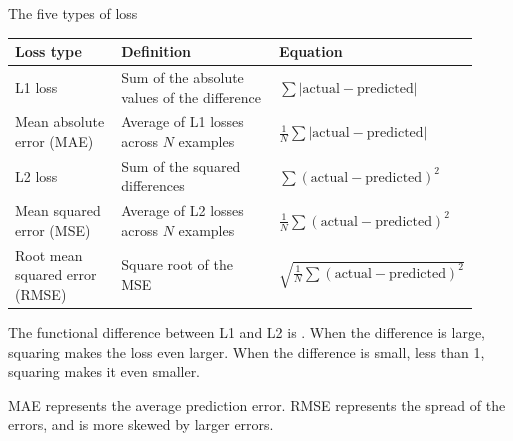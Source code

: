 \begin{frame}{The five types of loss}
  \begin{withmargin}
    \begin{tdmain}
      \footnotesize
      \begin{tabular}{@{}p{0.24\linewidth}p{0.36\linewidth}p{0.32\linewidth}@{}}
        \toprule
        \textbf{Loss type} & \textbf{Definition} & \textbf{Equation}\\
        \midrule
        L1 loss & Sum of the absolute values of the difference
          & $\sum |\text{actual} - \text{predicted}|$\\[0.4em]
        Mean absolute error (MAE) & Average of L1 losses across $N$ examples
          & $\frac{1}{N}\sum |\text{actual} - \text{predicted}|$\\[0.4em]
        L2 loss & Sum of the squared differences
          & $\sum (\text{actual} - \text{predicted})^2$\\[0.4em]
        Mean squared error (MSE) & Average of L2 losses across $N$ examples
          & $\frac{1}{N}\sum (\text{actual} - \text{predicted})^2$\\[0.4em]
        Root mean squared error (RMSE) & Square root of the MSE
          & $\sqrt{\frac{1}{N}\sum (\text{actual} - \text{predicted})^2}$\\
        \bottomrule
      \end{tabular}
    \end{tdmain}
    \begin{tdmargin}
      The functional difference between L1 and L2 is . When the
      difference is large, squaring makes the loss even larger. When the
      difference is small, less than 1, squaring makes it even smaller.
      \par\medskip
      MAE represents the average prediction error. RMSE represents the spread of
      the errors, and is more skewed by larger errors.
    \end{tdmargin}
  \end{withmargin}
\end{frame}

